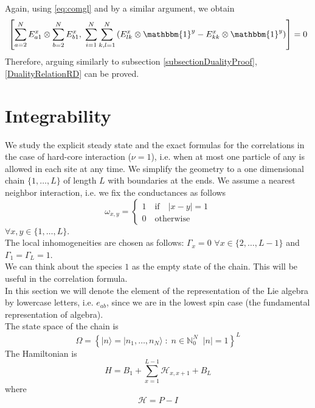 \documentclass[11pt]{article}
\numberwithin{equation}{section}
\numberwithin{equation}{subsection}
\newcommand{\id}{I}
\newcommand{\twoj}{\nu}
\begin{document}
 Again, using \eqref{eq:comgl} and by a similar argument, we obtain
\begin{equation}
\left[\sum_{a=2}^{N}E_{a1}^{x}\otimes \sum_{b=2}^{N}E_{b1}^{x},\;\sum_{i=1}^{N}\sum_{k,l=1}^{N}\left(E_{lk}^{x}\otimes \mathbbm{1}^{y}-E_{kk}^{x}\otimes \mathbbm{1}^{y}\right)\right]=0
\end{equation}
Therefore, arguing similarly to subsection \ref{subsectionDualityProof}, \eqref{DualityRelationRD} can be proved. 
\section{Integrability}\label{sec4}
We study the explicit steady state and the exact formulas for the correlations in the case of hard-core interaction ($\twoj=1$), i.e. when at most one particle of any is allowed in each site at any time. We simplify the geometry to a one dimensional chain $\{1,\ldots,L\}$ of length $L$ with boundaries at the ends. We assume a nearest neighbor interaction, i.e. we fix the conductances as follows
\begin{equation}
\omega_{x,y}=\begin{cases}
    1\quad \text{if}\quad |x-y|=1\\
    0\quad \text{otherwise}
\end{cases}
\end{equation}
$\forall x,y\in \{1,\ldots,L\}$.\\
The local inhomogeneities are chosen as follows: $\Gamma_{x}=0$ $\forall x\in \{2,\ldots,L-1\}$ and $\Gamma_{1}=\Gamma_{L}=1$. \\
We can think about the species $1$ as the empty state of the chain. This will be useful in the correlation formula.\\
In this section we will denote the element of the representation of the Lie algebra by lowercase letters, i.e. $e_{ab}$, since we are in the lowest spin case (the fundamental representation of algebra). \\
The state space of the chain is 
\begin{equation}
	\Omega=\left\{|n\rangle=|n_{1},\ldots,n_{N}\rangle\;:\;n\in\mathbb{N}_0^N\;\;|n|=1\right\}^{L}
\end{equation} 
The Hamiltonian is
\begin{equation}\label{hamiltonian}
	H=B_{1}+\sum_{x=1}^{L-1}\mathcal{H}_{x,x+1}+B_{L}
\end{equation}
where
\begin{equation}
	\begin{split}
		\mathcal{H}=P-\id
	\end{split}
\end{equation}
\end{document}
